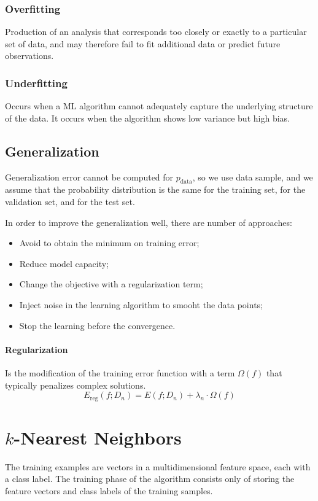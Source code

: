 \documentclass[a4paper,6pt,twocolumn,fleqn]{article}
\begin{document}
\subsubsection{Overfitting}
Production of an analysis that corresponds too closely or exactly to a particular set of data, and may therefore fail to fit additional data or predict future observations.
\subsubsection{Underfitting}
Occurs when a ML algorithm cannot adequately capture the underlying structure of the data. It occurs when the algorithm shows low variance but high bias.
\subsection{Generalization}
Generalization error cannot be computed for \(p_\text{data}\), so we use data sample, and we assume that the probability distribution is the same for the training set, for the validation set, and for the test set.

In order to improve the generalization well, there are number of approaches:
\begin{itemize}
    \item Avoid to obtain the minimum on training error;
    \item Reduce model capacity;
    \item Change the objective with a regularization term;
    \item Inject noise in the learning algorithm to smooht the data points;
    \item Stop the learning before the convergence.
\end{itemize}
\paragraph{Regularization}
Is the modification of the training error function with a term \(\Omega(f)\) that typically penalizes complex solutions.
\begin{equation}
    E_\text{reg} (f; D_n) = E (f; D_n) + \lambda_n \cdot \Omega(f)
\end{equation}

\section{\(k\)-Nearest Neighbors}
The training examples are vectors in a multidimensional feature space, each with a class
label. The training phase of the algorithm consists only of storing the feature vectors
and class labels of the training samples.
\end{document}
